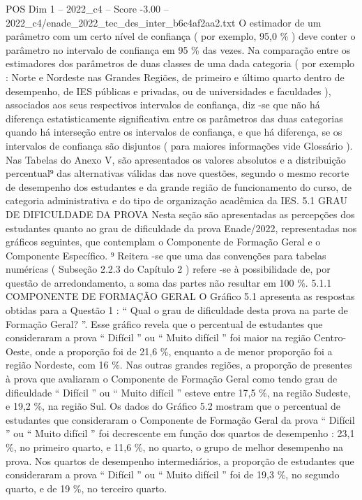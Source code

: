\begin{textsample}{POS Dim 1 – 2022\_c4 – Score -3.00 – 2022\_c4/enade\_2022\_tec\_des\_inter\_b6c4af2aa2.txt}
O estimador de um parâmetro com um certo nível de confiança ( por exemplo, 95,0 \% ) deve conter o parâmetro no intervalo de confiança em 95 \% das vezes.
Na comparação entre os estimadores dos parâmetros de duas classes de uma dada categoria ( por exemplo : Norte e Nordeste nas Grandes Regiões, de primeiro e último quarto dentro de desempenho, de IES públicas e privadas, ou de universidades e faculdades ), associados aos seus respectivos intervalos de confiança, diz -se que não há diferença estatisticamente significativa entre os parâmetros das duas categorias quando há interseção entre os intervalos de confiança, e que há diferença, se os intervalos de confiança são disjuntos ( para maiores informações vide Glossário ).
Nas Tabelas do Anexo V, são apresentados os valores absolutos e a distribuição percentual⁹ das alternativas válidas das nove questões, segundo o mesmo recorte de desempenho dos estudantes e da grande região de funcionamento do curso, de categoria administrativa e do tipo de organização acadêmica da IES. 5.1 GRAU DE DIFICULDADE DA PROVA Nesta seção são apresentadas as percepções dos estudantes quanto ao grau de dificuldade da prova Enade/2022, representadas nos gráficos seguintes, que contemplam o Componente de Formação Geral e o Componente Específico. ⁹ Reitera -se que uma das convenções para tabelas numéricas ( Subseção 2.2.3 do Capítulo 2 ) refere -se à possibilidade de, por questão de arredondamento, a soma das partes não resultar em 100 \%. 5.1.1 COMPONENTE DE FORMAÇÃO GERAL O Gráfico 5.1 apresenta as respostas obtidas para a Questão 1 : “ Qual o grau de dificuldade desta prova na parte de Formação Geral? ”.
Esse gráfico revela que o percentual de estudantes que consideraram a prova “ Difícil ” ou “ Muito difícil ” foi maior na região Centro-Oeste, onde a proporção foi de 21,6 \%, enquanto a de menor proporção foi a região Nordeste, com 16 \%.
Nas outras grandes regiões, a proporção de presentes à prova que avaliaram o Componente de Formação Geral como tendo grau de dificuldade “ Difícil ” ou “ Muito difícil ” esteve entre 17,5 \%, na região Sudeste, e 19,2 \%, na região Sul.
Os dados do Gráfico 5.2 mostram que o percentual de estudantes que consideraram o Componente de Formação Geral da prova “ Difícil ” ou “ Muito difícil ” foi decrescente em função dos quartos de desempenho : 23,1 \%, no primeiro quarto, e 11,6 \%, no quarto, o grupo de melhor desempenho na prova.
Nos quartos de desempenho intermediários, a proporção de estudantes que consideraram a prova “ Difícil ” ou “ Muito difícil ” foi de 19,3 \%, no segundo quarto, e de 19 \%, no terceiro quarto.

\end{textsample}
